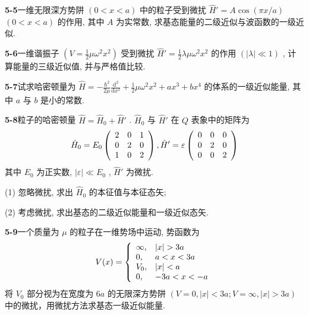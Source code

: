 \newpage
\vfill

\noindent
\textbf{5-5}\quad 一维无限深方势阱 $(0 < x < a)$ 中的粒子受到微扰 $\hat{H}' = A\cos (\pi x / a)$ $(0 < x < a)$ 的作用, 其中 $A$ 为实常数, 求基态能量的二级近似与波函数的一级近似.

\vfill

\newpage
\vfill

\noindent
\textbf{5-6}\quad 一维谐振子 $\left(V = \frac{1}{2}\mu \omega^2 x^2\right)$ 受到微扰 $\hat{H}' = \frac{1}{2}\lambda \mu \omega^2 x^2$ 的作用 $(|\lambda| \ll 1)$ , 计算能量的三级近似值, 并与严格值比较.

\vfill

\newpage
\vfill

\noindent
\textbf{5-7}\quad 试求哈密顿量为 $\hat{H} = -\frac{\hbar^2}{2\mu}\frac{\mathrm{d}^2}{\mathrm{d}x^2} +\frac{1}{2}\mu \omega^2 x^2 +ax^3 +bx^4$ 的体系的一级近似能量, 其中 $a$ 与 $b$ 是小的常数.

\vfill

\newpage
\vfill

\noindent
\textbf{5-8}\quad 粒子的哈密顿量 $\hat{H} = \hat{H}_0 + \hat{H}'$ . $\hat{H}_0$ 与 $\hat{H}'$ 在 $Q$ 表象中的矩阵为
$$
\hat {H} _ {0} = E _ {0} \left( \begin{array}{c c c} 2 & 0 & 1 \\ 0 & 2 & 0 \\ 1 & 0 & 2 \end{array} \right), \hat {H} ^ {\prime} = \varepsilon \left( \begin{array}{c c c} 0 & 0 & 0 \\ 0 & 2 & 0 \\ 0 & 0 & 2 \end{array} \right)
$$
其中 $E_0$ 为正实数, $\left|\varepsilon\right| \ll E_0$ , $\hat{H}'$ 为微扰. 

(1) 忽略微扰, 求出 $\hat{H}_0$ 的本征值与本征态矢; 

(2) 考虑微扰, 求出基态的二级近似能量和一级近似态矢.

\vfill

\newpage
\vfill

\noindent
\textbf{5-9}\quad 一个质量为 $\mu$ 的粒子在一维势场中运动, 势函数为
$$
V (x) = \left\{ \begin{array}{l l} \infty , & | x | > 3 a \\ 0, & a <   x <   3 a \\ V _ {0}, & | x | <   a \\ 0, & - 3 a <   x <   - a \end{array} \right.
$$
将 $V_{0}$ 部分视为在宽度为 $6a$ 的无限深方势阱 $(V = 0, |x| < 3a; V = \infty, |x| > 3a)$ 中的微扰，用微扰方法求基态一级近似能量.

